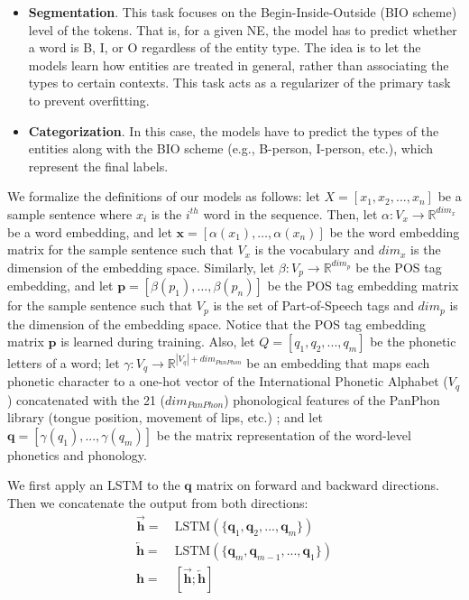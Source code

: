 \documentclass[11pt,a4paper]{article}
\begin{document}
\begin{itemize}
\item \textbf{Segmentation}. This task focuses on the Begin-Inside-Outside (BIO scheme) level of the tokens. That is, for a given NE, the model has to predict whether a word is B, I, or O regardless of the entity type. The idea is to let the models learn how entities are treated in general, rather than associating the types to certain contexts. This task acts as a regularizer of the primary task to prevent overfitting.
\item \textbf{Categorization}. In this case, the models have to predict the types of the entities along with the BIO scheme (e.g., B-person, I-person, etc.), which represent the final labels.
\end{itemize}

We formalize the definitions of our models as follows: let $X = [x_1, x_2, ..., x_n]$ be a sample sentence where $x_i$ is the $i^{th}$ word in the sequence. Then, let $\alpha:V_x\rightarrow \mathbb{R}^{dim_x}$ be a word embedding, and let $\mathbf{x} = [\alpha(x_1), \ldots, \alpha(x_n)]$ be the word embedding matrix for the sample sentence such that $V_x$ is the vocabulary and $dim_x$ is the dimension of the embedding space. Similarly, let $\beta : V_p \rightarrow  \mathbb{R}^{dim_p}$ be the POS tag embedding, and let $\mathbf{p} =  [\beta(p_1), \ldots, \beta(p_n)]$ be the POS tag embedding matrix for the sample sentence such that $V_p$ is the set of Part-of-Speech tags and  $dim_p$ is the dimension of the embedding space. Notice that the POS tag embedding matrix $\mathbf{p} $ is learned during training. Also, let $Q = [q_1, q_2, ..., q_m]$ be the phonetic letters of a word; let  $\gamma : V_q \rightarrow \mathbb{R}^{|V_q|+dim_{PanPhon}}$ be  an embedding that maps each phonetic character to a one-hot vector of the International Phonetic Alphabet ($V_q$) concatenated with the 21 ($dim_{PanPhon}$) phonological features of the PanPhon library (tongue position, movement of lips, etc.) \citep{bharadwaj-EtAl:2016:EMNLP2016}; and let $\mathbf{q} = [\gamma(q_1), ..., \gamma(q_m)]$ be the matrix representation of the word-level phonetics and phonology.

We first apply an LSTM \citep{Hochreiter:1997:LSM:1246443.1246450} to the $\mathbf{q}$ matrix on forward and backward directions. Then we concatenate the output from both directions:
\begin{equation*} \label{eq:blstm}
\begin{split}
\overrightarrow{\mathbf{h}} = &~\textrm{LSTM}(\{\mathbf{q}_1, \mathbf{q}_2, ..., \mathbf{q}_m\}) \\
\overleftarrow{\mathbf{h}} = &~\textrm{LSTM}(\{\mathbf{q}_m, \mathbf{q}_{m-1}, ..., \mathbf{q}_1\}) \\
\mathbf{h} = &~[\overrightarrow{\mathbf{h}};\overleftarrow{\mathbf{h}}]
\end{split}
\end{equation*}
\end{document}
